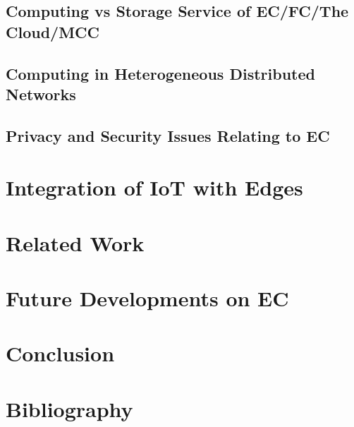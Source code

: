 \documentclass[10pt]{article}
\begin{document}
\subsection{Computing vs Storage Service of EC/FC/The Cloud/MCC}

\subsection{Computing in Heterogeneous Distributed Networks}

\subsection{Privacy and Security Issues Relating to EC}

\section{Integration of IoT with Edges}

\section{Related Work}

\section{Future Developments on EC}

\section{Conclusion}






\section*{Bibliography}
 \printbibliography
\end{document}
